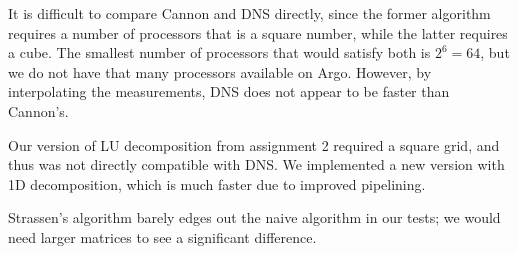\documentclass{article}
\begin{document}
It is difficult to compare Cannon and DNS directly, since the former algorithm requires a number of processors
 that is a square number, while the latter requires a cube. The smallest number of processors that would satisfy both is $2^6 = 64$, but we do not have
 that many processors available on Argo. However, by interpolating the measurements, DNS does not appear to be faster than Cannon's.

Our version of LU decomposition from assignment 2 required a square grid, and thus was not directly compatible with DNS. We implemented a new version with
1D decomposition, which is much faster due to improved pipelining.

Strassen's algorithm barely edges out the naive algorithm in our tests; we would need larger matrices to see a significant difference.


% 
% 
% 




\newpage
~
% 
% 
% 
% 
% 
% 
% 
% 
\end{document}
